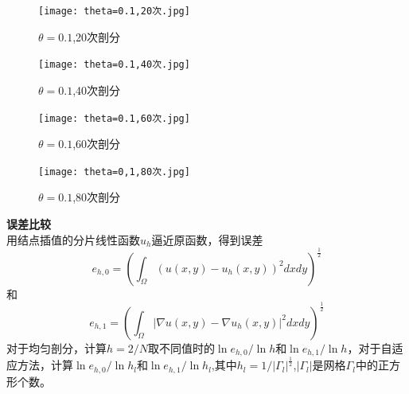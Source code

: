 \documentclass[12pt]{ctexart}
\begin{document}
\begin{figure}[H]
	\centering
	\begin{minipage}[t]{0.48\textwidth}
		\centering
		\texttt{[image: theta=0.1,20次.jpg]}
		\caption{$\theta=0.1$,20次剖分}
	\end{minipage}
	\begin{minipage}[t]{0.48\textwidth}
		\centering
		\texttt{[image: theta=0.1,40次.jpg]}
		\caption{$\theta=0.1$,40次剖分}
	\end{minipage}
\end{figure}
\begin{figure}[H]
	\centering
	\begin{minipage}[t]{0.48\textwidth}
		\centering
		\texttt{[image: theta=0.1,60次.jpg]}
		\caption{$\theta=0.1$,60次剖分}
	\end{minipage}
	\begin{minipage}[t]{0.48\textwidth}
		\centering
		\texttt{[image: theta=0,1,80次.jpg]}
		\caption{$\theta=0.1$,80次剖分}
	\end{minipage}
\end{figure}
\noindent \textbf{误差比较}\\
用结点插值的分片线性函数$u_h$逼近原函数，得到误差
$$e_{h,0} = (\int_{\Omega}(u(x,y)-u_h(x,y))^2dxdy)^\frac{1}{2}$$
和
$$e_{h,1} = (\int_{\Omega}|\nabla u(x,y)-\nabla u_h(x,y)|^2dxdy)^\frac{1}{2}$$
对于均匀剖分，计算$h=2/N$取不同值时的$\ln e_{h,0}/\ln{h}$和$\ln e_{h,1}/\ln{h}$，对于自适应方法，计算$\ln e_{h,0}/\ln{h_l}$和$\ln e_{h,1}/\ln{h_l}$,其中$h_l=1/|\varGamma_{l}|^\frac{1}{2}$,$|\varGamma_{l}|$是网格$\varGamma_{l}$中的正方形个数。
\end{document}
